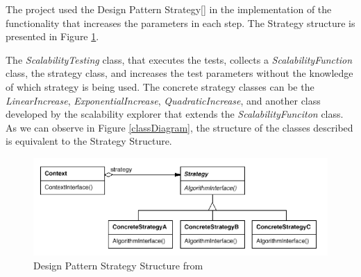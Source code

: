 The project used the Design Pattern Strategy[\cite{GOF1995}] in the implementation of the functionality that increases the parameters in each step. The Strategy structure is presented in Figure \ref{strategyStructure}. 

The \emph{ScalabilityTesting} class, that executes the tests, collects a \emph{ScalabilityFunction} class, the strategy class, and increases the test parameters without the knowledge of which strategy is being used. The concrete strategy classes can be the \emph{LinearIncrease}, \emph{ExponentialIncrease}, \emph{QuadraticIncrease}, and another class developed by the scalability explorer that extends the \emph{ScalabilityFunciton} class. As we can observe in Figure \ref{classDiagram}, the structure of the classes described is equivalent to the Strategy Structure.
\begin{figure}[htbp]
\begin{center}
	\includegraphics[scale=0.5]{images/strategyStructure}
\caption{Design Pattern Strategy Structure from \cite{GOF1995}}
\label{strategyStructure}
\end{center}
\end{figure}


